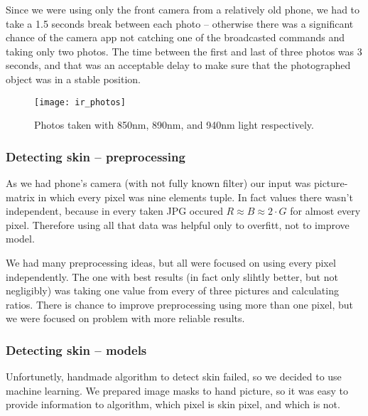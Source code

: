             Since we were using only the front camera from a relatively old phone,
            we had to take a 1.5 seconds break between each photo -- otherwise
            there was a significant chance of the camera app not catching one of the
            broadcasted commands and taking only two photos.
            The time between the first and last of three photos was 3 seconds,
            and that was an acceptable delay to make sure that the photographed
            object was in a stable position.

            \begin{figure}[H]
                \caption{Photos taken with 850nm, 890nm, and 940nm light respectively.}
                \centering
                \texttt{[image: ir\_photos]}
                \label{fig:ir_photos}
            \end{figure}

            \subsubsection*{Detecting skin -- preprocessing}
                As we had phone's camera (with not fully known filter)
                our input was picture-matrix
                in which every pixel was nine elements tuple.
                In fact values there wasn't independent, because
                in every taken JPG occured $R \approx B \approx 2 \cdot G$
                for almost every pixel.
                Therefore using all that data was helpful only to overfitt,
                not to improve model.

                We had many preprocessing ideas, but all were focused
                on using every pixel independently.
                The one with best results (in fact only slihtly better,
                but not negligibly) was taking one value from every
                of three pictures and calculating ratios.
                There is chance to improve preprocessing using more than one pixel,
                but we were focused on problem with more reliable results.

            \subsubsection*{Detecting skin -- models}
                Unfortunetly, handmade algorithm to detect skin failed,
                so we decided to use machine learning.
                We prepared image masks to hand picture,
                so it was easy to provide information to algorithm, which
                pixel is skin pixel, and which is not.

